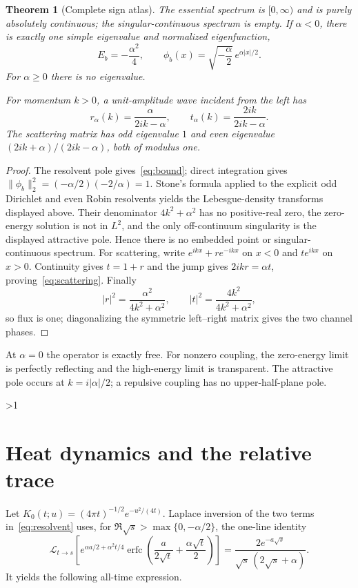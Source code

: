 \documentclass[10pt]{article}
\providecommand{\CRevisionRound}{2}
\newtheorem{theorem}{Theorem}
\newcommand{\erfc}{\operatorname{erfc}}
\begin{document}
\begin{theorem}[Complete sign atlas]\label{thm:spectrum}
The essential spectrum is $[0,\infty)$ and is purely absolutely continuous;
the singular-continuous spectrum is empty.  If $\alpha<0$, there is exactly
one simple eigenvalue and normalized eigenfunction,
\begin{equation}\label{eq:bound}
 E_b=-\frac{\alpha^2}{4},\qquad
 \phi_b(x)=\sqrt{-\frac\alpha2}\,e^{\alpha|x|/2}.
\end{equation}
For $\alpha\ge0$ there is no eigenvalue.

For momentum $k>0$, a unit-amplitude wave incident from the left has
\begin{equation}\label{eq:scattering}
 r_\alpha(k)=\frac{\alpha}{2ik-\alpha},\qquad
 t_\alpha(k)=\frac{2ik}{2ik-\alpha}.
\end{equation}
The scattering matrix has odd eigenvalue $1$ and even eigenvalue
$(2ik+\alpha)/(2ik-\alpha)$, both of modulus one.
\end{theorem}
\begin{proof}
The resolvent pole gives~\eqref{eq:bound}; direct integration gives
$\|\phi_b\|_2^2=(-\alpha/2)(-2/\alpha)=1$.  Stone's formula applied to the
explicit odd Dirichlet and even Robin resolvents yields the Lebesgue-density
transforms displayed above.  Their denominator $4k^2+\alpha^2$ has no
positive-real zero, the zero-energy solution is not in $L^2$, and the only
off-continuum singularity is the displayed attractive pole.  Hence there is
no embedded point or singular-continuous spectrum.  For scattering, write
$e^{ikx}+re^{-ikx}$ on $x<0$ and $te^{ikx}$ on $x>0$.  Continuity gives
$t=1+r$ and the jump gives $2ikr=\alpha t$, proving~\eqref{eq:scattering}.
Finally
\[
 |r|^2=\frac{\alpha^2}{4k^2+\alpha^2},\qquad
 |t|^2=\frac{4k^2}{4k^2+\alpha^2},
\]
so flux is one; diagonalizing the symmetric left--right matrix gives the two
channel phases.
\end{proof}

At $\alpha=0$ the operator is exactly free.  For nonzero coupling, the
zero-energy limit is perfectly reflecting and the high-energy limit is
transparent.  The attractive pole occurs at $k=i|\alpha|/2$; a repulsive
coupling has no upper-half-plane pole.
\fi

\ifnum\CRevisionRound>1
\section{Heat dynamics and the relative trace}
Let $K_0(t;u)=(4\pi t)^{-1/2}e^{-u^2/(4t)}$.  Laplace inversion of the two
terms in~\eqref{eq:resolvent} uses, for
$\Re\sqrt{s}>\max\{0,-\alpha/2\}$, the one-line identity
\[
 \mathcal L_{t\to s}\!\left[
 e^{\alpha a/2+\alpha^2t/4}
 \erfc\!\left(\frac{a}{2\sqrt t}+\frac{\alpha\sqrt t}{2}\right)\right]
 =\frac{2e^{-a\sqrt{s}}}{\sqrt{s}\,(2\sqrt{s}+\alpha)}.
\]
It yields the following all-time expression.
\end{document}
